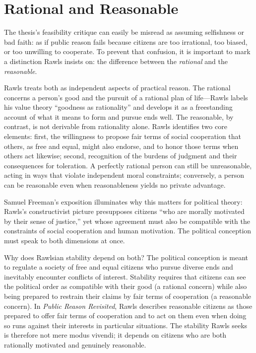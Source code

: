 \documentclass[12pt]{report}
\begin{document}
\section{Rational and Reasonable}
The thesis's feasibility critique can easily be misread as assuming selfishness or bad faith: as if public reason fails because citizens are too irrational, too biased, or too unwilling to cooperate. To prevent that confusion, it is important to mark a distinction Rawls insists on: the difference between the \emph{rational} and the \emph{reasonable}.

Rawls treats both as independent aspects of practical reason. The rational concerns a person's good and the pursuit of a rational plan of life---Rawls labels his value theory ``goodness as rationality'' and develops it as a freestanding account of what it means to form and pursue ends well.\parencite[pp.~347,~359--365]{rawls1999theory} The reasonable, by contrast, is not derivable from rationality alone. Rawls identifies two core elements: first, the willingness to propose fair terms of social cooperation that others, as free and equal, might also endorse, and to honor those terms when others act likewise; second, recognition of the burdens of judgment and their consequences for toleration.\parencite[p.~134]{rawls1995reply} A perfectly rational person can still be unreasonable, acting in ways that violate independent moral constraints; conversely, a person can be reasonable even when reasonableness yields no private advantage.

Samuel Freeman's exposition illuminates why this matters for political theory: Rawls's constructivist picture presupposes citizens ``who are morally motivated by their sense of justice,'' yet whose agreement must also be compatible with the constraints of social cooperation and human motivation.\parencite[p.~xi]{freeman2007rawls} The political conception must speak to both dimensions at once.

Why does Rawlsian stability depend on both? The political conception is meant to regulate a society of free and equal citizens who pursue diverse ends and inevitably encounter conflicts of interest. Stability requires that citizens can see the political order as compatible with their good (a rational concern) while also being prepared to restrain their claims by fair terms of cooperation (a reasonable concern). In \emph{Public Reason Revisited}, Rawls describes reasonable citizens as those prepared to offer fair terms of cooperation and to act on them even when doing so runs against their interests in particular situations.\parencite[p.~771]{rawls1997public} The stability Rawls seeks is therefore not mere modus vivendi; it depends on citizens who are both rationally motivated and genuinely reasonable.
\end{document}
